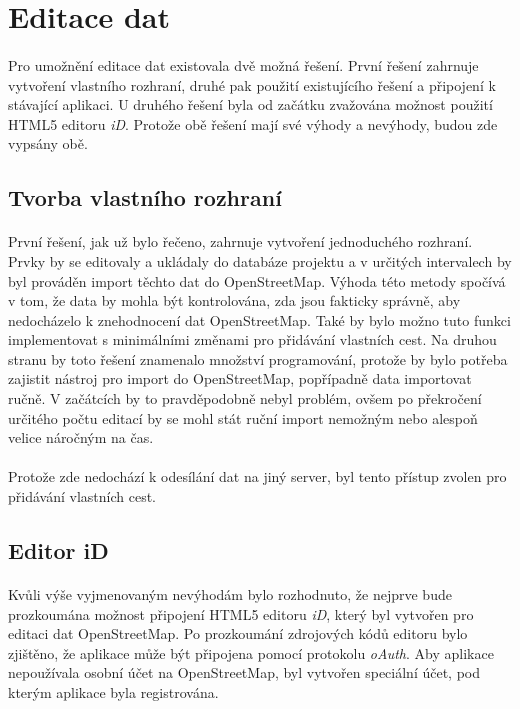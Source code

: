 \documentclass[11pt,a4paper,titlepage,oneside]{book}
\begin{document}
		\section{Editace dat}
				\paragraph{} Pro umožnění editace dat existovala dvě možná řešení. První řešení zahrnuje vytvoření vlastního rozhraní, druhé pak použití existujícího řešení a připojení k stávající aplikaci. U druhého řešení byla od začátku zvažována možnost použití HTML5 editoru \textit{iD}. Protože obě řešení mají své výhody a nevýhody, budou zde vypsány obě.
			\subsection{Tvorba vlastního rozhraní}
				\paragraph{} První řešení, jak už bylo řečeno, zahrnuje vytvoření jednoduchého rozhraní. Prvky by se editovaly a  ukládaly do databáze projektu a v určitých intervalech by byl prováděn import těchto dat do OpenStreetMap. Výhoda této metody spočívá v tom, že data by mohla být kontrolována, zda jsou fakticky správně, aby nedocházelo k znehodnocení dat OpenStreetMap. Také by bylo možno tuto funkci implementovat s minimálními změnami pro přidávání vlastních cest. Na druhou stranu by toto řešení znamenalo množství programování, protože by bylo potřeba zajistit nástroj pro import do OpenStreetMap, popřípadně data importovat ručně. V začátcích by to pravděpodobně nebyl problém, ovšem po překročení určitého počtu editací by se mohl stát ruční import nemožným nebo alespoň velice náročným na čas.
				\paragraph{} Protože zde nedochází k odesílání dat na jiný server, byl tento přístup zvolen pro přidávání vlastních cest.
			\subsection{Editor iD} 
				\paragraph{} Kvůli výše vyjmenovaným nevýhodám bylo rozhodnuto, že nejprve bude prozkoumána možnost připojení HTML5 editoru \textit{iD}, který byl vytvořen pro editaci dat OpenStreetMap. Po prozkoumání zdrojových kódů editoru bylo zjištěno, že aplikace může být připojena pomocí protokolu \textit{oAuth}. Aby aplikace nepoužívala osobní účet na OpenStreetMap, byl vytvořen speciální účet, pod kterým aplikace byla registrována. 
\end{document}
